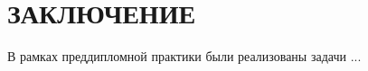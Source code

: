 \sectionbreak \section*{
	\gostTitleFont
	\redline
	ЗАКЛЮЧЕНИЕ
}

\subtitlespace

{\gostFont
	\par \redline В рамках преддипломной практики были реализованы задачи ...
	
}

\setcounter{subchaptercntr}{1}
\setcounter{formulacntr}{1}
\setcounter{imagecntr}{1}